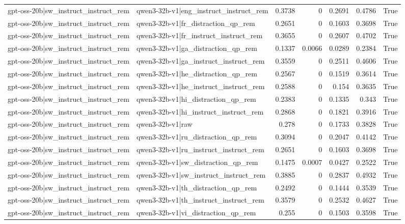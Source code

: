 \begin{table}
\begin{tabular}{l l r r r r l}
gpt-oss-20b|sw_instruct_instruct_rem & qwen3-32b-v1|eng_instruct_instruct_rem & 0.3738 & 0 & 0.2691 & 0.4786 & True \\
gpt-oss-20b|sw_instruct_instruct_rem & qwen3-32b-v1|fr_distraction_qp_rem & 0.2651 & 0 & 0.1603 & 0.3698 & True \\
gpt-oss-20b|sw_instruct_instruct_rem & qwen3-32b-v1|fr_instruct_instruct_rem & 0.3655 & 0 & 0.2607 & 0.4702 & True \\
gpt-oss-20b|sw_instruct_instruct_rem & qwen3-32b-v1|ga_distraction_qp_rem & 0.1337 & 0.0066 & 0.0289 & 0.2384 & True \\
gpt-oss-20b|sw_instruct_instruct_rem & qwen3-32b-v1|ga_instruct_instruct_rem & 0.3559 & 0 & 0.2511 & 0.4606 & True \\
gpt-oss-20b|sw_instruct_instruct_rem & qwen3-32b-v1|he_distraction_qp_rem & 0.2567 & 0 & 0.1519 & 0.3614 & True \\
gpt-oss-20b|sw_instruct_instruct_rem & qwen3-32b-v1|he_instruct_instruct_rem & 0.2588 & 0 & 0.154 & 0.3635 & True \\
gpt-oss-20b|sw_instruct_instruct_rem & qwen3-32b-v1|hi_distraction_qp_rem & 0.2383 & 0 & 0.1335 & 0.343 & True \\
gpt-oss-20b|sw_instruct_instruct_rem & qwen3-32b-v1|hi_instruct_instruct_rem & 0.2868 & 0 & 0.1821 & 0.3916 & True \\
gpt-oss-20b|sw_instruct_instruct_rem & qwen3-32b-v1|raw & 0.278 & 0 & 0.1733 & 0.3828 & True \\
gpt-oss-20b|sw_instruct_instruct_rem & qwen3-32b-v1|ru_distraction_qp_rem & 0.3094 & 0 & 0.2047 & 0.4142 & True \\
gpt-oss-20b|sw_instruct_instruct_rem & qwen3-32b-v1|ru_instruct_instruct_rem & 0.2651 & 0 & 0.1603 & 0.3698 & True \\
gpt-oss-20b|sw_instruct_instruct_rem & qwen3-32b-v1|sw_distraction_qp_rem & 0.1475 & 0.0007 & 0.0427 & 0.2522 & True \\
gpt-oss-20b|sw_instruct_instruct_rem & qwen3-32b-v1|sw_instruct_instruct_rem & 0.3885 & 0 & 0.2837 & 0.4932 & True \\
gpt-oss-20b|sw_instruct_instruct_rem & qwen3-32b-v1|th_distraction_qp_rem & 0.2492 & 0 & 0.1444 & 0.3539 & True \\
gpt-oss-20b|sw_instruct_instruct_rem & qwen3-32b-v1|th_instruct_instruct_rem & 0.3579 & 0 & 0.2532 & 0.4627 & True \\
gpt-oss-20b|sw_instruct_instruct_rem & qwen3-32b-v1|vi_distraction_qp_rem & 0.255 & 0 & 0.1503 & 0.3598 & True \\

\end{tabular}
\end{table}
